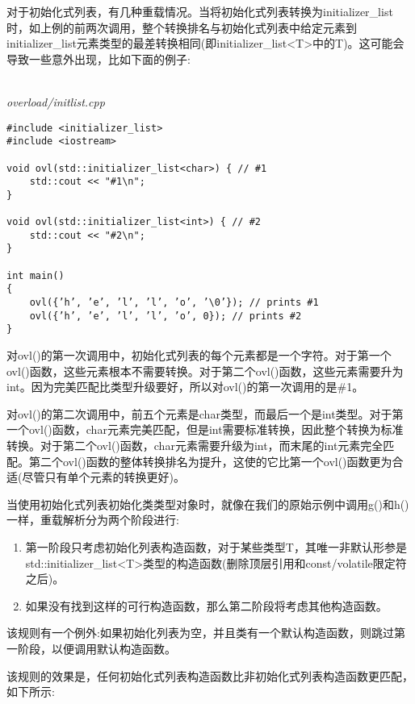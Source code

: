 对于初始化式列表，有几种重载情况。当将初始化式列表转换为initializer\_list时，如上例的前两次调用，整个转换排名与初始化式列表中给定元素到initializer\_list元素类型的最差转换相同(即initializer\_list<T>中的T)。这可能会导致一些意外出现，比如下面的例子:

\hspace*{\fill} \\ %
\noindent
\textit{overload/initlist.cpp}
\begin{lstlisting}[style=styleCXX]
#include <initializer_list>
#include <iostream>

void ovl(std::initializer_list<char>) { // #1
	std::cout << "#1\n";
}

void ovl(std::initializer_list<int>) { // #2
	std::cout << "#2\n";
}

int main()
{
	ovl({’h’, ’e’, ’l’, ’l’, ’o’, ’\0’}); // prints #1
	ovl({’h’, ’e’, ’l’, ’l’, ’o’, 0}); // prints #2
}
\end{lstlisting}

对ovl()的第一次调用中，初始化式列表的每个元素都是一个字符。对于第一个ovl()函数，这些元素根本不需要转换。对于第二个ovl()函数，这些元素需要升为int。因为完美匹配比类型升级要好，所以对ovl()的第一次调用的是\#1。

对ovl()的第二次调用中，前五个元素是char类型，而最后一个是int类型。对于第一个ovl()函数，char元素完美匹配，但是int需要标准转换，因此整个转换为标准转换。对于第二个ovl()函数，char元素需要升级为int，而末尾的int元素完全匹配。第二个ovl()函数的整体转换排名为提升，这使的它比第一个ovl()函数更为合适(尽管只有单个元素的转换更好)。

当使用初始化式列表初始化类类型对象时，就像在我们的原始示例中调用g()和h()一样，重载解析分为两个阶段进行:

\begin{enumerate}
\item
第一阶段只考虑初始化列表构造函数，对于某些类型T，其唯一非默认形参是std::initializer\_list<T>类型的构造函数(删除顶层引用和const/volatile限定符之后)。

\item
如果没有找到这样的可行构造函数，那么第二阶段将考虑其他构造函数。
\end{enumerate}

该规则有一个例外:如果初始化列表为空，并且类有一个默认构造函数，则跳过第一阶段，以便调用默认构造函数。

该规则的效果是，任何初始化式列表构造函数比非初始化式列表构造函数更匹配，如下所示:

